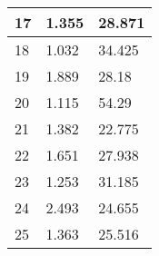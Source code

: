 \begin{table}[!ht]
\begin{tabular}{|l|l|l|}
        17 & 1.355 & 28.871 \\ \hline
        18 & 1.032 & 34.425 \\ \hline
        19 & 1.889 & 28.18 \\ \hline
        20 & 1.115 & 54.29 \\ \hline
        21 & 1.382 & 22.775 \\ \hline
        22 & 1.651 & 27.938 \\ \hline
        23 & 1.253 & 31.185 \\ \hline
        24 & 2.493 & 24.655 \\ \hline
        25 & 1.363 & 25.516 \\ \hline
    \end{tabular}
    \label{table:Daugmentation_images_1}
\end{table}

